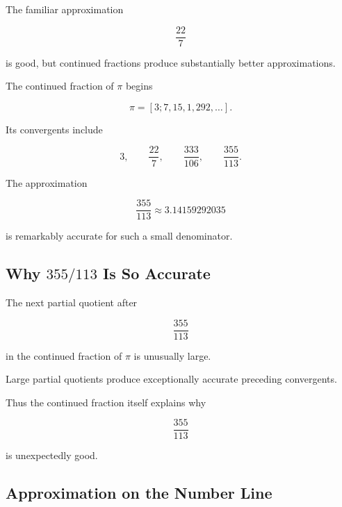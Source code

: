 The familiar approximation

\[ \frac{22}{7} \]

is good, but continued fractions produce substantially better approximations.

The continued fraction of \(\pi\) begins

\[ \pi=[3;7,15,1,292,\ldots]. \]

Its convergents include

\[
3,\qquad
\frac{22}{7},\qquad
\frac{333}{106},\qquad
\frac{355}{113}.
\]

The approximation

\[ \boxed{\frac{355}{113}\approx3.14159292035} \]

is remarkably accurate for such a small denominator.

\subsection{Why \(355/113\) Is So Accurate}
\label{subsec:pi-355-113}

The next partial quotient after

\[ \frac{355}{113} \]

in the continued fraction of \(\pi\) is unusually large.

Large partial quotients produce exceptionally accurate preceding
convergents.

Thus the continued fraction itself explains why

\[ \frac{355}{113} \]

is unexpectedly good.

\subsection{Approximation on the Number Line}
\label{subsec:rational-approximation-number-line}

\begin{centereddiagram}
\end{centereddiagram}

